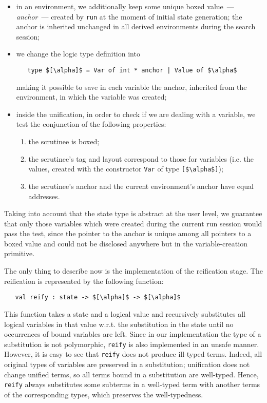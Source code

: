 \begin{itemize}
\item in an environment, we additionally keep some unique boxed value~--- \emph{anchor}~--- created by \lstinline{run} at the moment of initial
state generation; the anchor is inherited unchanged in all derived environments during the search session;
\item we change the logic type definition into

\begin{lstlisting}
   type $[\alpha]$ = Var of int * anchor | Value of $\alpha$
\end{lstlisting}

\noindent making it possible to save in each variable the anchor, inherited from the environment, in which the variable was created;

\item inside the unification, in order to check if we are dealing with a variable, we test the conjunction of the following properties:

  \begin{enumerate}
    \item the scrutinee is boxed;
    \item the scrutinee's tag and layout correspond to those for variables (i.e. the values, created with the constructor \lstinline{Var} of
type \lstinline{[$\alpha$]});
    \item the scrutinee's anchor and the current environment's anchor have equal addresses.
  \end{enumerate}
\end{itemize}

Taking into account that the state type is abstract at the user level, we guarantee that only those variables which were
created during the current run session would pass the test, since the pointer to the anchor is unique among all pointers to a boxed value
and could not be disclosed anywhere but in the variable-creation primitive.

The only thing to describe now is the implementation of the reification stage. The reification is represented by the following
function:

\begin{lstlisting}
   val reify : state -> $[\alpha]$ -> $[\alpha]$
\end{lstlisting}

This function takes a state and a logical value and recursively substitutes all logical variables in that value w.r.t.
the substitution in the state until no occurrences of bound variables are left. Since in our implementation the type of a substitution is
not polymorphic, \lstinline{reify} is also implemented in an unsafe manner. However, it is easy to see that \lstinline{reify}
does not produce ill-typed terms. Indeed, all original types of variables are preserved in a substitution; unification does not
change unified terms, so all terms bound in a substitution are well-typed. Hence, \lstinline{reify} always substitutes
some subterms in a well-typed term with another terms of the corresponding types, which preserves the well-typedness.

